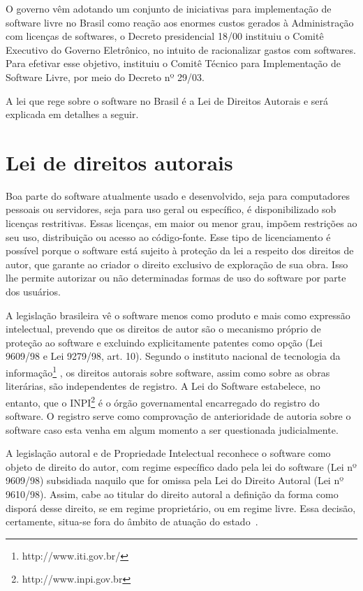 O governo vêm adotando um conjunto de iniciativas para implementação de software
livre no Brasil como reação aos enormes custos gerados à Administração com licenças
de softwares, o Decreto presidencial 18/00 instituiu o Comitê Executivo do Governo
Eletrônico, no intuito de racionalizar gastos com softwares. Para efetivar esse 
objetivo, instituiu o Comitê Técnico para Implementação de Software Livre, por
meio do Decreto nº 29/03.

A lei que rege sobre o software no Brasil é a Lei de Direitos Autorais e será 
explicada em detalhes a seguir. 


\section{Lei de direitos autorais}

Boa parte do software atualmente usado e desenvolvido, seja para computadores 
pessoais ou servidores, seja para uso geral ou específico, é disponibilizado sob
licenças restritivas. Essas licenças, em maior ou menor grau, impõem restrições 
ao seu uso, distribuição ou acesso ao código-fonte. Esse tipo de licenciamento é 
possível porque o software está sujeito à proteção da lei a respeito dos direitos 
de autor, que garante ao criador o direito exclusivo de exploração de sua obra. 
Isso lhe permite autorizar ou não determinadas formas de uso do software por parte 
dos usuários.%

A legislação brasileira vê o software menos como produto e mais como expressão 
intelectual, prevendo que os direitos de autor são o mecanismo próprio de proteção 
ao software e excluindo explicitamente patentes como opção (Lei 9609/98 e Lei 9279/98, art. 10).
Segundo o instituto nacional de tecnologia da informação\footnote{http://www.iti.gov.br/}
, os direitos autorais sobre software, assim como sobre as obras literárias, são 
independentes de registro. A Lei do Software estabelece, no entanto, que o INPI\footnote{http://www.inpi.gov.br}
é o órgão governamental encarregado do registro do software. O registro serve 
como comprovação de anterioridade de autoria sobre o software caso esta venha 
em algum momento a ser questionada judicialmente.

A legislação autoral e de Propriedade Intelectual reconhece o software como objeto 
de direito do autor, com regime específico dado pela lei do software (Lei nº 9609/98)
subsidiada naquilo que for omissa pela Lei do Direito Autoral (Lei nº 9610/98).
%
Assim, cabe ao titular do direito autoral a definição da forma como disporá desse
direito, se em regime proprietário, ou em regime livre. Essa decisão, certamente,
situa-se fora do âmbito de atuação do estado~\cite{junior2005software}.

